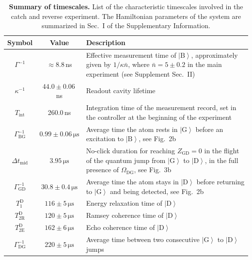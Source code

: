 \documentclass[
	 			preprint,     		superscriptaddress, 																longbibliography,
		amsmath, amssymb,
		aps,  prb,   		floatfix,
		linenumbers     
	]{revtex4-1}
\newcommand{\ket}[1]{\left|#1\right>}
\begin{document}
\begin{table}[!ht]
\begin{centering}
\addtolength{\tabcolsep}{2pt} \begin{tabular}{cc>{\raggedright}p{}}
\hline 
\textbf{Symbol} & \textbf{Value} & \textbf{Description}\tabularnewline
\hline 
$\Gamma^{-1}$ & $\approx8.8$\,ns & Effective measurement time of $\ket{\mathrm{B}}$, approximately given
by $1/ \kappa\bar{n} $, where $\bar{n} = 5  \pm 0.2$ in the main experiment (see Supplement Sec.~II)\tabularnewline
$\kappa^{-1}$ & $44.0 \pm0.06$\,ns & Readout cavity lifetime\tabularnewline
$T_{\mathrm{int}}$ & 260.0\,ns & Integration time of the measurement record, set in the controller at the beginning of the experiment \tabularnewline
$\Gamma_{\mathrm{BG}}^{-1}$ & $0.99\pm0.06\,\mathrm{\mu s}$ & Average time the atom rests in $\ket{\mathrm{G}}$ before an excitation
to $\ket{\mathrm{B}}$, see Fig.~2b\tabularnewline
$\Delta t_{\mathrm{mid}}$ & $3.95\,\mathrm{\mu s}$ & No-click duration for reaching $Z_\mathrm{GD} = 0$ in the flight of the quantum jump from $\ket{\mathrm{G}}$ to $\ket{\mathrm{D}}$, in the full
presence of $\Omega_{\mathrm{DG}}$, see Fig.~3b\tabularnewline
$\Gamma_{\mathrm{GD}}^{-1}$ & $30.8\pm0.4\,\mathrm{\mu s}$ & Average time the atom stays in $\ket{\mathrm{D}}$ before returning
to $\ket{\mathrm{G}}$ and being detected, see Fig.~2b\tabularnewline
$T_{1}^{\mathrm{D}}$ & $116\pm5\,\mathrm{\mu s}$ & Energy relaxation time of $\ket{\mathrm{D}}$\tabularnewline
$T_{2\mathrm{R}}^{\mathrm{D}}$ & $120\pm5\,\mathrm{\mu s}$ & Ramsey coherence time of $\ket{\mathrm{D}}$\tabularnewline
$T_{2\mathrm{E}}^{\mathrm{D}}$ & $162\pm6\,\mathrm{\mu s}$ & Echo coherence time of $\ket{\mathrm{D}}$\tabularnewline
$\Gamma_{\mathrm{DG}}^{-1}$ & $220\pm5\,\mathrm{\mu s}$ & Average time between two consecutive $\ket{\mathrm{G}}$ to $\ket{\mathrm{D}}$
jumps\tabularnewline
\end{tabular}
\par\end{centering}
\caption{
\textbf{Summary of timescales.}
List of the characteristic timescales involved in the catch and reverse experiment. 
The Hamiltonian parameters of the system are summarized in Sec.~I of the Supplementary Information. 
\label{tab:summary-timescales}
}
\end{table}
\end{document}
